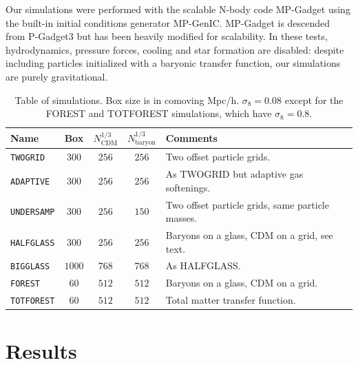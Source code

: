 \documentclass[a4paper,11pt]{article}
\begin{document}
Our simulations were performed with the scalable N-body code MP-Gadget \cite{yu_feng_2018_1451799} using the built-in initial conditions generator MP-GenIC. MP-Gadget is descended from P-Gadget3 but has been heavily modified for scalability. In these tests, hydrodynamics, pressure forces, cooling and star formation are disabled: despite including particles initialized with a baryonic transfer function, our simulations are purely gravitational.

\begin{table}
\begin{center}
\begin{tabular}{|l|c|c|c|l|}
\hline
Name & Box & $N_\mathrm{CDM}^{1/3}$ & $N_\mathrm{baryon}^{1/3}$ & Comments  \\
\hline
\texttt{TWOGRID}    &   $300$ & $256$ & $256$ & Two offset particle grids. \\
\texttt{ADAPTIVE}    &   $300$ & $256$ & $256$ & As TWOGRID but adaptive gas softenings. \\
\texttt{UNDERSAMP}  &   $300$ & $256$ & $150$ & Two offset particle grids, same particle masses. \\
\texttt{HALFGLASS}  &   $300$ & $256$ & $256$ & Baryons on a glass, CDM on a grid, see text. \\
\texttt{BIGGLASS}  &   $1000$ & $768$ & $768$ & As HALFGLASS. \\
\texttt{FOREST}  &   $60$ & $512$ & $512$ & Baryons on a glass, CDM on a grid. \\
\texttt{TOTFOREST}  &   $60$ & $512$ & $512$ & Total matter transfer function. \\

\hline
\end{tabular}
\end{center}
\caption{Table of simulations. Box size is in comoving Mpc/h. $\sigma_8 = 0.08$ except for the FOREST and TOTFOREST simulations, which have $\sigma_8 = 0.8$.}
\label{tab:simulations}
\end{table}

\section{Results}
\end{document}
